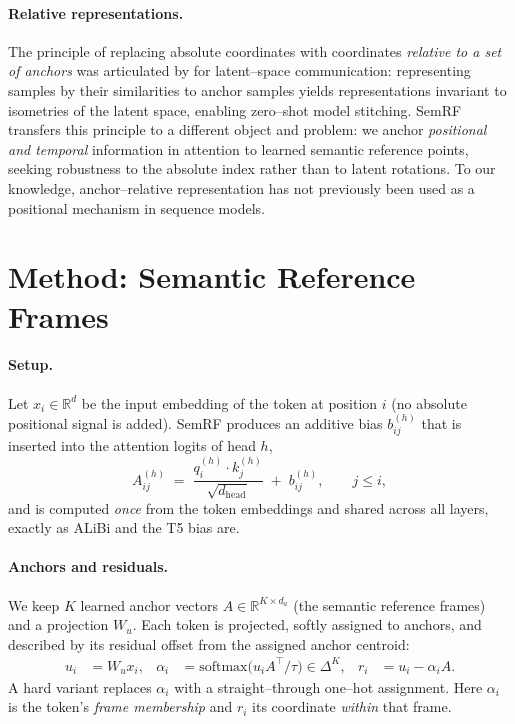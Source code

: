 \documentclass[11pt]{article}
\begin{document}
\paragraph{Relative representations.} The principle of replacing absolute
coordinates with coordinates \emph{relative to a set of anchors} was
articulated by \citet{moschella2023relative} for latent--space communication:
representing samples by their similarities to anchor samples yields
representations invariant to isometries of the latent space, enabling zero--shot
model stitching. SemRF transfers this principle to a different object and
problem: we anchor \emph{positional and temporal} information in attention to
learned semantic reference points, seeking robustness to the absolute index
rather than to latent rotations. To our knowledge, anchor--relative
representation has not previously been used as a positional mechanism in
sequence models.

\section{Method: Semantic Reference Frames}
\label{sec:method}

\paragraph{Setup.} Let $x_i \in \mathbb{R}^{d}$ be the input embedding of the
token at position $i$ (no absolute positional signal is added). SemRF produces an
additive bias $b^{(h)}_{ij}$ that is inserted into the attention logits of head
$h$,
\begin{equation}
  A^{(h)}_{ij} \;=\; \frac{q_i^{(h)}\!\cdot k_j^{(h)}}{\sqrt{d_{\mathrm{head}}}}
  \;+\; b^{(h)}_{ij}, \qquad j \le i,
\end{equation}
and is computed \emph{once} from the token embeddings and shared across all
layers, exactly as ALiBi and the T5 bias are.

\paragraph{Anchors and residuals.} We keep $K$ learned anchor vectors
$A \in \mathbb{R}^{K \times d_a}$ (the semantic reference frames) and a
projection $W_u$. Each token is projected, softly assigned to anchors, and
described by its residual offset from the assigned anchor centroid:
\begin{align}
  u_i &= W_u x_i, &
  \alpha_i &= \mathrm{softmax}\!\big(u_i A^\top / \tau\big) \in \Delta^{K}, &
  r_i &= u_i - \alpha_i A .
\end{align}
A hard variant replaces $\alpha_i$ with a straight--through one--hot assignment.
Here $\alpha_i$ is the token's \emph{frame membership} and $r_i$ its coordinate
\emph{within} that frame.
\end{document}
